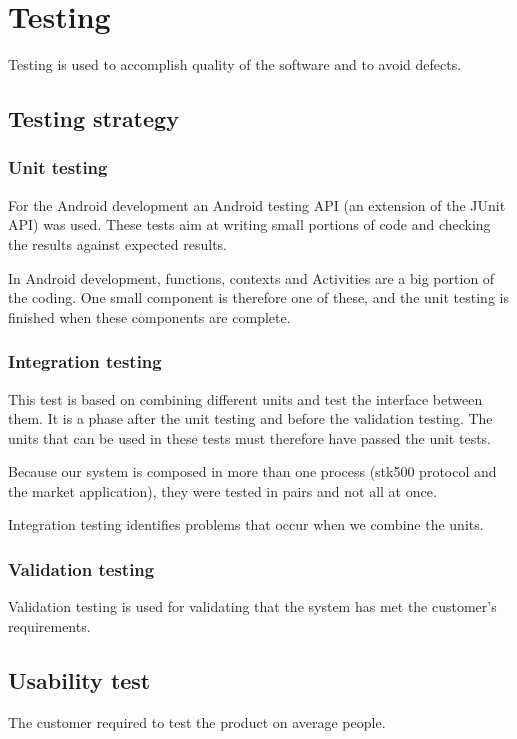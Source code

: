 \chapter{Testing}
	Testing is used to accomplish quality of the software and to avoid defects.
	
	\section{Testing strategy}
		\subsection{Unit testing}
			For the Android development an Android testing API (an extension of the JUnit API) was used.
			These tests aim at writing small portions of code and checking the results against expected results.

			In Android development, functions, contexts and Activities are a big portion of the coding.
			One small component is therefore one of these, and the unit testing is finished when these components are complete.

		\subsection{Integration testing}
			This test is based on combining different units and test the interface between them. It is a phase after the unit testing and before the validation testing. The units that can be used in these tests must therefore have passed the unit tests.

			Because our system is composed in more than one process (stk500 protocol and the market application), they
			were tested in pairs and not all at once.

			Integration testing identifies problems that occur when we combine the units.

		\subsection{Validation testing}
			Validation testing is used for validating that the system has met the customer's requirements.

	\section{Usability test}
		The customer required to test the product on average people.
